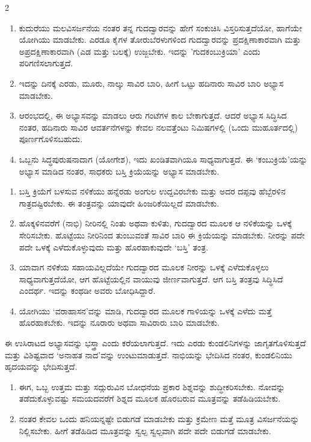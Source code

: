 \begin{multicols}{2}
\begin{kan}

\begin{enumerate}[nosep]
\item[8.] ಕುದುರೆಯು ಮಲವಿಸರ್ಜನೆಯ ನಂತರ ತನ್ನ ಗುದದ್ವಾರವನ್ನು ಹೇಗೆ ಸಂಕುಚಿಸಿ ವಿಸ್ತರಿಸುತ್ತದೆಯೋ, ಹಾಗೆಯೇ ಯೋಗಿಯು ಮಾಡಬೇಕು. ಎರಡೂ ಕೈಗಳ ತೋರುಬೆರಳುಗಳಿಂದ ಗುದದ್ವಾರವನ್ನು ಪ್ರದಕ್ಷಿಣಾಕಾರವಾಗಿ ಮತ್ತು ಅಪ್ರದಕ್ಷಿಣಾಕಾರವಾಗಿ (ಎಡ ಮತ್ತು ಬಲಕ್ಕೆ) ಉಜ್ಜಬೇಕು. ಇದನ್ನು 'ಗುದಕಂಬುಕ್ರಿಯಾ'  ಎಂದು ಪರಿಗಣಿಸಲಾಗುತ್ತದೆ.
\item[9.] ಇದನ್ನು ದಿನಕ್ಕೆ ಎರಡು, ಮೂರು, ನಾಲ್ಕು ಸಾವಿರ ಬಾರಿ, ಹೀಗೆ ಒಟ್ಟು ಹದಿನಾರು ಸಾವಿರ ಬಾರಿ ಅಭ್ಯಾಸ ಮಾಡಬೇಕು.
\item[10.] ಆರಂಭದಲ್ಲಿ, ಈ ಅಭ್ಯಾಸವನ್ನು ಮಾಡಲು ಆರು ಗಂಟೆಗಳ ಕಾಲ ಬೇಕಾಗುತ್ತದೆ. ಆದರೆ ಅಭ್ಯಾಸ ಸಿದ್ಧಿಸಿದ ನಂತರ, ಹದಿನಾರು ಸಾವಿರ ಆವರ್ತನೆಗಳನ್ನು ಕೇವಲ ನಲವತ್ತೆಂಟು ನಿಮಿಷಗಳಲ್ಲಿ (ಒಂದು ಮುಹೂರ್ತದಲ್ಲಿ) ಪೂರ್ಣಗೊಳಿಸಬಹುದು.
\item[11.] ಒಬ್ಬನು ಸಿದ್ಧಪುರುಷನಾದಾಗ (ಯೋಗೇಶ), ಇದು ಖಂಡಿತವಾಗಿಯೂ ಸಾಧ್ಯವಾಗುತ್ತದೆ. ಈ ‘ಕಂಬುಕ್ರಿಯೆ’ಯನ್ನು ಅಭ್ಯಾಸ ಮಾಡಿದ ನಂತರ, ಸಾಧಕರು ಬಸ್ತಿ ಕ್ರಿಯೆಯನ್ನು ಅಭ್ಯಾಸ ಮಾಡಬೇಕು.
\end{enumerate} 
\vskip 5pt


\begin{enumerate}[nosep]
\item[12.] ಬಸ್ತಿ ಕ್ರಿಯೆಗೆ ಬಳಸುವ ನಳಿಕೆಯು ಹನ್ನೆರಡು ಅಂಗುಲ ಉದ್ದವಿರಬೇಕು ಮತ್ತು ಅದರ ದಪ್ಪವು ಹೆಬ್ಬೆರಳಿನ ಗಾತ್ರದಷ್ಟಿರಬೇಕು. ಈ ತಂತ್ರವನ್ನು ಯಾವುದೇ ಹಿಂಜರಿಕೆಯಿಲ್ಲದೆ ಮಾಡಬೇಕು.
\item[13.] ಹೊಕ್ಕಳಿನವರೆಗೆ (ನಾಭಿ) ನೀರಿನಲ್ಲಿ ನಿಂತು ಅಥವಾ ಕುಳಿತು, ಗುದದ್ವಾರದ ಮೂಲಕ ಆ ನಳಿಕೆಯನ್ನು ಒಳಕ್ಕೆ ಸೇರಿಸಬೇಕು. ಹೊಟ್ಟೆಯು ನೀರಿನಿಂದ ತುಂಬುವಂತೆ ಸಾವಿರ ಬಾರಿ ಈ ಕ್ರಿಯೆಯನ್ನು ಮಾಡಬೇಕು. ನೀರನ್ನು ಪದೇ ಪದೇ ಒಳಕ್ಕೆ ಎಳೆದುಕೊಳ್ಳುವುದು ಮತ್ತು ಹೊರಹಾಕುವುದೇ ‘ಬಸ್ತಿ’ ತಂತ್ರ.
\item[14.] ಯಾವಾಗ ನಳಿಕೆಯ ಸಹಾಯವಿಲ್ಲದೆಯೇ ಗುದದ್ವಾರದ ಮೂಲಕ ನೀರನ್ನು ಒಳಕ್ಕೆ ಎಳೆದುಕೊಳ್ಳಲು ಸಾಧ್ಯವಾಗುತ್ತದೆಯೋ, ಆಗ ಹೊಟ್ಟೆಯಲ್ಲಿನ ವಾಯುವು ಜೀರ್ಣವಾಗುತ್ತದೆ. ಆಗ ಬಸ್ತಿ ತಂತ್ರವು ಸಿದ್ಧಿಸಿದೆ ಎಂದರ್ಥ. ಇದನ್ನು ಕಂಥಡೀ ಅವರು ಬೋಧಿಸಿದ್ದಾರೆ.
\item[15.] ಯೋಗಿಯು ‘ವರಾಹಾಸನ’ವನ್ನು ಮಾಡಿ, ಗುದದ್ವಾರದ ಮೂಲಕ ಗಾಳಿಯನ್ನು ಒಳಕ್ಕೆ ಎಳೆದು ಮತ್ತೆ ಹೊರಹಾಕಬೇಕು. ಇದನ್ನು ನೂರಾರು ಅಥವಾ ಸಾವಿರಾರು ಬಾರಿ ಮಾಡಬೇಕು.
\end{enumerate}
ಈ ಉಸಿರಾಟದ ಅಭ್ಯಾಸವನ್ನು ಭಸ್ತ್ರಾ ಎಂದು ಕರೆಯಲಾಗುತ್ತದೆ. ಇದು ಎರಡು ಕುಂಡಲಿನಿಗಳನ್ನು ಜಾಗೃತಗೊಳಿಸುತ್ತದೆ ಮತ್ತು ವಿಶಿಷ್ಟವಾದ ‘ಅನಾಹತ ನಾದ’ವನ್ನು  ಉಂಟುಮಾಡುತ್ತದೆ. ನಾಭಿಯನ್ನು ಭೇದಿಸಿದ ನಂತರ, ಕುಂಡಲಿನಿಯು ಹೃದಯವನ್ನು ಭೇದಿಸುತ್ತದೆ.
\vskip 5pt


\begin{enumerate}[nosep]
\itemsep=0pt
\item[16.] ಈಗ, ಒಬ್ಬ ಉತ್ತಮ ಮತ್ತು ಸದ್ಗುರುವಿನ ಬೋಧನೆಯ ಪ್ರಕಾರ ಶಿಶ್ನವನ್ನು ಶುದ್ಧೀಕರಿಸಬೇಕು. ನೋವನ್ನು ತಡೆದುಕೊಳ್ಳುವಷ್ಟು ಸಮಯದವರೆಗೆ ಶಿಶ್ನದ ಮೂಲಕ ಹೊರಬರುವ ಮೂತ್ರವನ್ನು ತಡೆಹಿಡಿಯಬೇಕು.
\item[17.] ನಂತರ ಕೇವಲ ಒಂದು ಹನಿಯನ್ನಷ್ಟೇ ಬಿಡುಗಡೆ ಮಾಡಬೇಕು ಮತ್ತು ಕ್ರಮೇಣ ಮತ್ತೆ ಮೂತ್ರ ವಿಸರ್ಜನೆಯನ್ನು ನಿಲ್ಲಿಸಬೇಕು. ಹೀಗೆ ತಡೆಹಿಡಿದ ಮೂತ್ರವನ್ನು ಸ್ವಲ್ಪ ಸ್ವಲ್ಪವಾಗಿ ಪದೇ ಪದೇ ಬಿಡುಗಡೆ ಮಾಡಬೇಕು.
\end{enumerate}
\end{kan}
\end{multicols}

